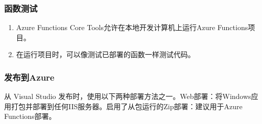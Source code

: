 \subsubsection{函数测试} 
\begin{enumerate}
	\item Azure Functions Core Tools允许在本地开发计算机上运行Azure Functions项目。
	\item 在运行项目时，可以像测试已部署的函数一样测试代码。
\end{enumerate}	

\subsubsection{发布到Azure} 
从 Visual Studio 发布时，使用以下两种部署方法之一。Web部署：将Windows应用打包并部署到任何IIS服务器。启用了从包运行的Zip部署：建议用于Azure Functions部署。
